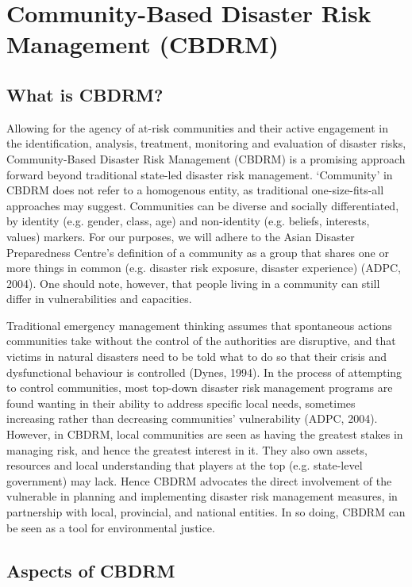 \section{Community-Based Disaster Risk Management (CBDRM)}

\subsection{What is CBDRM?}

Allowing for the agency of at-risk communities and their active engagement in the identification, analysis, treatment, monitoring and evaluation of disaster risks, Community-Based Disaster Risk Management (CBDRM) is a promising approach forward beyond traditional state-led disaster risk management. ‘Community’ in CBDRM does not refer to a homogenous entity, as traditional one-size-fits-all approaches may suggest. Communities can be diverse and socially differentiated, by identity (e.g. gender, class, age) and non-identity (e.g. beliefs, interests, values) markers. For our purposes, we will adhere to the Asian Disaster Preparedness Centre’s definition of a community as a group that shares one or more things in common (e.g. disaster risk exposure, disaster experience) (ADPC, 2004). One should note, however, that people living in a community can still differ in vulnerabilities and capacities.

Traditional emergency management thinking assumes that spontaneous actions communities take without the control of the authorities are disruptive, and that victims in natural disasters need to be told what to do so that their crisis and dysfunctional behaviour is controlled (Dynes, 1994). In the process of attempting to control communities, most top-down disaster risk management programs are found wanting in their ability to address specific local needs, sometimes increasing rather than decreasing communities’ vulnerability (ADPC, 2004). However, in CBDRM, local communities are seen as having the greatest stakes in managing risk, and hence the greatest interest in it. They also own assets, resources and local understanding that players at the top (e.g. state-level government) may lack. Hence CBDRM advocates the direct involvement of the vulnerable in planning and implementing disaster risk management measures, in partnership with local, provincial, and national entities. In so doing, CBDRM can be seen as a tool for environmental justice.

\subsection{Aspects of CBDRM}	

